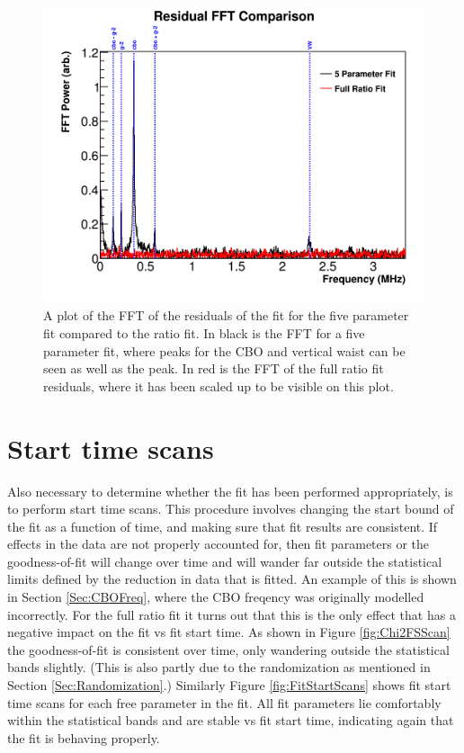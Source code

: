 	\begin{figure}[]
		\centering
		\includegraphics[width=\textwidth]{FFTComparison_RatioCBO}
	    \caption[FFTComparison_RatioCBO]{A plot of the FFT of the residuals of the fit for the five parameter fit compared to the ratio fit. In black is the FFT for a five parameter fit, where peaks for the CBO and vertical waist can be seen as well as the \gmtwo peak. In red is the FFT of the full ratio fit residuals, where it has been scaled up to be visible on this plot.}
	    \label{fig:FFTComparison_RatioCBO}
	\end{figure}

\clearpage

\section{Start time scans}

	Also necessary to determine whether the fit has been performed appropriately, is to perform start time scans. This procedure involves changing the start bound of the fit as a function of time, and making sure that fit results are consistent. If effects in the data are not properly accounted for, then fit parameters or the goodness-of-fit will change over time and will wander far outside the statistical limits defined by the reduction in data that is fitted. An example of this is shown in Section \ref{Sec:CBOFreq}, where the CBO freqency was originally modelled incorrectly. For the full ratio fit it turns out that this is the only effect that has a negative impact on the fit vs fit start time. As shown in Figure \ref{fig:Chi2FSScan} the goodness-of-fit is consistent over time, only wandering outside the statistical bands slightly. (This is also partly due to the randomization as mentioned in Section \ref{Sec:Randomization}.) Similarly Figure \ref{fig:FitStartScans} shows fit start time scans for each free parameter in the fit. All fit parameters lie comfortably within the statistical bands and are stable vs fit start time, indicating again that the fit is behaving properly.

